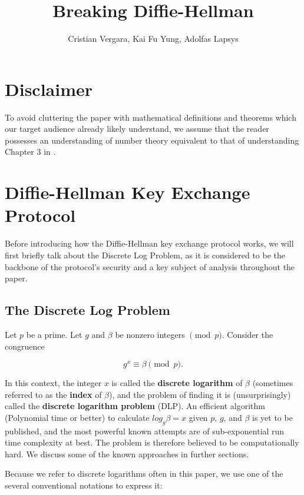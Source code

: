 \documentclass{article}
\author{Cristian Vergara, Kai Fu Yung, Adolfas Lapsys}
\title{Breaking Diffie-Hellman}
\begin{document}
\maketitle{}
\newpage{}
\tableofcontents{}
\newpage{}

\section{Disclaimer}

To avoid cluttering the paper with mathematical definitions and theorems which our target audience already likely understand, we assume that the reader possesses an understanding of number theory equivalent to that of understanding Chapter 3 in \autocite{TrappeWashington2005}.

\section{Diffie-Hellman Key Exchange Protocol}

Before introducing how the Diffie-Hellman key exchange protocol works, we will first briefly talk about the Discrete Log Problem, as it is considered to be the backbone of the protocol's security and a key subject of analysis throughout the paper.

\subsection{The Discrete Log Problem}

Let $p$ be a prime. Let $g$ and $\beta$ be nonzero integers $\pmod{p}$. Consider the congruence

$$g^x \equiv \beta \pmod{p}.$$

In this context, the integer $x$ is called the \textbf{discrete logarithm} of $\beta$ (sometimes referred to as the \textbf{index} of $\beta$), and the problem of finding it is (unsurprisingly) called the \textbf{discrete logarithm problem} (DLP). An efficient algorithm (Polynomial time or better) to calculate $log_g \beta = x$ given $p$, $g$, and $\beta$ is yet to be published, and the most powerful known attempts are of sub-exponential run time complexity at best. The problem is therefore believed to be computationally hard. We discuss some of the known approaches in further sections.

Because we refer to discrete logarithms often in this paper, we use one of the several conventional notations to express it:
\end{document}
